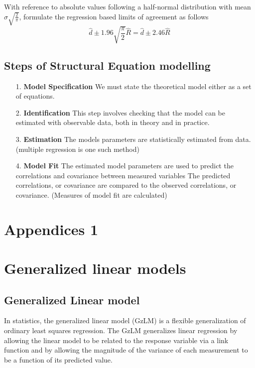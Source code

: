\documentclass[12pt, a4paper]{report}
\theoremstyle{plain}
\theoremstyle{definition}
\theoremstyle{remark}
\begin{document}
With reference to absolute values following a half-normal
distribution with mean $\sigma\sqrt{\frac{2}{\pi}}$, \citet{BA99} formulate the regression based limits of agreement as
follows
\begin{equation}
\hat{d} \pm 1.96\sqrt{\frac{\pi}{2}}\hat{R} = \hat{d} \pm 2.46\hat{R}
\end{equation}

\newpage


	\section{Steps of Structural Equation modelling}
	
	\begin{itemize}
		\item[1.] \textbf{Model Specification}
		We must state the theoretical model either as a set of equations.
		
		\item[2.] \textbf{Identification }
		This step involves checking that the model can be estimated with observable data, both in theory and in practice.
		
		\item[3.] \textbf{Estimation}
		The models parameters are statistically estimated from data. (multiple regression is one such method)
		
		\item[4.] \textbf{Model Fit}
		The estimated model parameters are used to predict the correlations and covariance between measured variables 
		The predicted correlations, or covariance are compared to the observed correlations, or covariance. (Measures of model fit are calculated)
	\end{itemize}


	\chapter{Appendices 1}
	
	


	\chapter{Generalized linear models}
	\section{Generalized Linear model}
	In statistics, the generalized linear model (GzLM) is a flexible
	generalization of ordinary least squares regression. The GzLM
	generalizes linear regression by allowing the linear model to be
	related to the response variable via a link function and by
	allowing the magnitude of the variance of each measurement to be a
	function of its predicted value.
	
\end{document}
